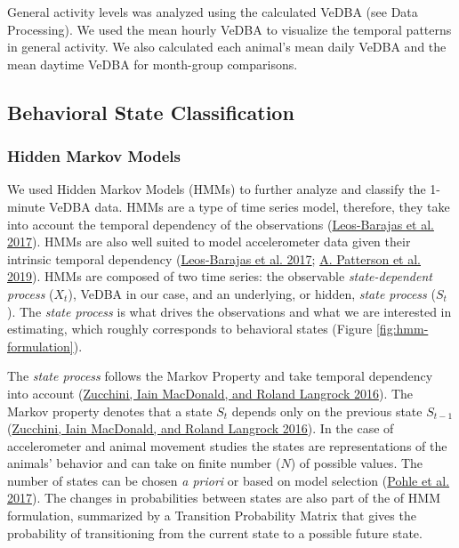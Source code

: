 \documentclass[msc,numbers,hidelinks]{coppe}
\begin{document}
  General activity levels was analyzed using the calculated VeDBA (see Data Processing). We used the mean hourly VeDBA to visualize the temporal patterns in general activity. We also calculated each animal's mean daily VeDBA and the mean daytime VeDBA for month-group comparisons.

  \hypertarget{behavioral-state-classification}{%
  \subsection{Behavioral State Classification}\label{behavioral-state-classification}}

  \hypertarget{hidden-markov-models}{%
  \subsubsection{Hidden Markov Models}\label{hidden-markov-models}}

  We used Hidden Markov Models (HMMs) to further analyze and classify the 1-minute VeDBA data. HMMs are a type of time series model, therefore, they take into account the temporal dependency of the observations (\protect\hyperlink{ref-leosbarajas2017}{Leos-Barajas et al. 2017}). HMMs are also well suited to model accelerometer data given their intrinsic temporal dependency (\protect\hyperlink{ref-leosbarajas2017}{Leos-Barajas et al. 2017}; \protect\hyperlink{ref-patterson2019}{A. Patterson et al. 2019}). HMMs are composed of two time series: the observable \emph{state-dependent process} (\(X_t\)), VeDBA in our case, and an underlying, or hidden, \emph{state process} (\(S_t\)). The \emph{state process} is what drives the observations and what we are interested in estimating, which roughly corresponds to behavioral states (Figure \ref{fig:hmm-formulation}).

  The \emph{state process} follows the Markov Property and take temporal dependency into account (\protect\hyperlink{ref-zucchini2016}{Zucchini, Iain MacDonald, and Roland Langrock 2016}). The Markov property denotes that a state \(S_t\) depends only on the previous state \(S_{t-1}\) (\protect\hyperlink{ref-zucchini2016}{Zucchini, Iain MacDonald, and Roland Langrock 2016}). In the case of accelerometer and animal movement studies the states are representations of the animals' behavior and can take on finite number (\(N\)) of possible values. The number of states can be chosen \emph{a priori} or based on model selection (\protect\hyperlink{ref-pohle2017}{Pohle et al. 2017}). The changes in probabilities between states are also part of the of HMM formulation, summarized by a Transition Probability Matrix that gives the probability of transitioning from the current state to a possible future state.
\end{document}
